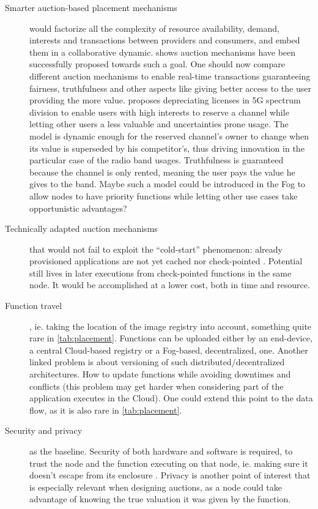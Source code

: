 \documentclass[11pt]{sdm}
\begin{document}
\begin{description}
	\item[Smarter auction-based placement mechanisms] would factorize all the complexity of resource availability, demand, interests and transactions between providers and consumers, and embed them in a collaborative dynamic.  shows auction mechanisms have been successfully proposed towards such a goal. One should now compare different auction mechanisms to enable real-time transactions guaranteeing fairness, truthfulness and other aspects like giving better access to the user providing the more value. \citet{milgrom_redesigning_2017} proposes depreciating licenses in 5G spectrum division to enable users with high interests to reserve a channel while letting other users a less valuable and uncertainties prone usage. The model is dynamic enough for the reserved channel's owner to change when its value is superseded by his competitor's, thus driving innovation in the particular case of the radio band usages. Truthfulness is guaranteed because the channel is only rented, meaning the user pays the value he gives to the band. Maybe such a model could be introduced in the Fog to allow nodes to have priority functions while letting other use cases take opportunistic advantages?

	\item[Technically adapted auction mechanisms] that would not fail to exploit the ``cold-start'' phenomenon: already provisioned applications are not yet cached nor check-pointed \cite{karhula_checkpointing_2019}. Potential still lives in later executions from check-pointed functions in the same node. It would be accomplished at a lower cost, both in time and resource.

		\item[Function travel], ie. taking the location of the image registry into account, something quite rare in \cref{tab:placement}. Functions can be uploaded either by an end-device, a central Cloud-based registry or a Fog-based, decentralized, one. Another linked problem is about versioning of such distributed/decentralized architectures. How to update functions while avoiding downtimes and conflicts (this problem may get harder when considering part of the application executes in the Cloud). One could extend this point to the data flow, as it is also rare in \cref{tab:placement}.

	\item[Security and privacy] as the baseline. Security of both hardware and software is required, to trust the node and the function executing on that node, ie. making sure it doesn't escape from its enclosure \cite{maurice_hello_2017}. Privacy is another point of interest that is especially relevant when designing auctions, as a node could take advantage of knowing the true valuation it was given by the function.
\end{description}
\end{document}
